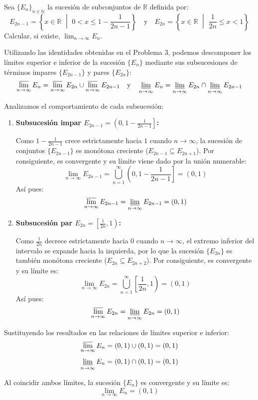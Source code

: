 \begin{problema}
Sea $\{E_n\}_{n \in \mathbb{N}}$ la sucesión de subconjuntos de $\mathbb{R}$ definida por:
\[
    E_{2n-1} = \left\{ x \in \mathbb{R} \,\,\middle|\,\, 0 < x \le 1 - \frac{1}{2n-1} \right\} \quad \text{y} \quad E_{2n} = \left\{ x \in \mathbb{R} \,\,\middle|\,\, \frac{1}{2n} \le x < 1 \right\}
\]
Calcular, si existe, $\displaystyle \lim_{n \to \infty} E_n$.

\tcblower

Utilizando las identidades obtenidas en el Problema 3, podemos descomponer los límites superior e inferior de la sucesión $\{E_n\}$ mediante sus subsucesiones de términos impares $\{E_{2n-1}\}$ y pares $\{E_{2n}\}$:
\[
    \varlimsup_{n \to \infty} E_n = \varlimsup_{n \to \infty} E_{2n} \cup \varlimsup_{n \to \infty} E_{2n-1} \quad \text{y} \quad \varliminf_{n \to \infty} E_n = \varliminf_{n \to \infty} E_{2n} \cap \varliminf_{n \to \infty} E_{2n-1}
\]

Analizamos el comportamiento de cada subsucesión:

\begin{enumerate}[label=\arabic*.]
    \item \textbf{Subsucesión impar $E_{2n-1} = \left(0, 1 - \frac{1}{2n-1}\right]$:}
    
    Como $1 - \frac{1}{2n-1}$ crece estrictamente hacia $1$ cuando $n \to \infty$, la sucesión de conjuntos $\{E_{2n-1}\}$ es monótona creciente ($E_{2n-1} \subseteq E_{2n+1}$). Por consiguiente, es convergente y su límite viene dado por la unión numerable:
    \[
        \lim_{n \to \infty} E_{2n-1} = \bigcup_{n=1}^\infty \left(0, 1 - \frac{1}{2n-1}\right] = (0, 1)
    \]
    Así pues:
    \[
        \varlimsup_{n \to \infty} E_{2n-1} = \varliminf_{n \to \infty} E_{2n-1} = (0, 1)
    \]

    \item \textbf{Subsucesión par $E_{2n} = \left[\frac{1}{2n}, 1\right)$:}
    
    Como $\frac{1}{2n}$ decrece estrictamente hacia $0$ cuando $n \to \infty$, el extremo inferior del intervalo se expande hacia la izquierda, por lo que la sucesión $\{E_{2n}\}$ es también monótona creciente ($E_{2n} \subseteq E_{2n+2}$). Por consiguiente, es convergente y su límite es:
    \[
        \lim_{n \to \infty} E_{2n} = \bigcup_{n=1}^\infty \left[\frac{1}{2n}, 1\right) = (0, 1)
    \]
    Así pues:
    \[
        \varlimsup_{n \to \infty} E_{2n} = \varliminf_{n \to \infty} E_{2n} = (0, 1)
    \]
\end{enumerate}

Sustituyendo los resultados en las relaciones de límites superior e inferior:
\[
    \varlimsup_{n \to \infty} E_n = (0, 1) \cup (0, 1) = (0, 1)
\]
\[
    \varliminf_{n \to \infty} E_n = (0, 1) \cap (0, 1) = (0, 1)
\]

Al coincidir ambos límites, la sucesión $\{E_n\}$ es convergente y su límite es:
\[
    \lim_{n \to \infty} E_n = (0, 1)
\]
\end{problema}
